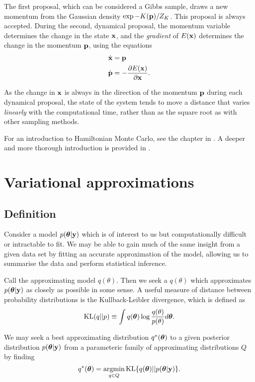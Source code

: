 \documentclass{amsart}[12pt]
\begin{document}
The first proposal, which can be considered a Gibbs sample, draws a new momentum from the Gaussian density
$\exp{-K({\bf p})}/Z_K$. This proposal is always accepted. During the second, dynamical proposal, the momentum
variable determines the change in the state ${\bf x}$, and the \emph{gradient} of $E({\bf x})$ determines the change
in the momentum ${\bf p}$, using the equations
\begin{align*}
	\dot{{\bf x}} & = {\bf p}                                    \\
	\dot{{\bf p}} & = -\frac{\partial E({\bf x})}{\partial {\bf x}}. 
\end{align*}

As the change in ${\bf x}$ is always in the direction of the momentum ${\bf p}$ during each dynamical proposal, the
state of the system tends to move a distance that varies \emph{linearly} with the computational time, rather
than as the square root as with other sampling methods.

For an introduction to Hamiltonian Monte Carlo, see the chapter in \cite{MacKay:2002:ITI:971143}. A deeper
and more thorough introduction is provided in \cite{Betancourt2017}.


\section{Variational approximations}

\subsection{Definition}

Consider a model $p({\boldsymbol \theta}|{\bf y})$ which is of interest to us but computationally difficult or intractable to 
fit. We may be able to gain much of the same insight from a given data set by fitting an accurate approximation 
of the model, allowing us to summarise the data and perform statistical inference.

Call the approximating model $q(\theta)$. Then we seek a $q(\theta)$ which approximates $p({\boldsymbol \theta}|{\bf y})$
as closely as possible in some sense. A useful measure of distance between probability distributions is the
Kullback-Leibler divergence, which is defined as
\[
	\text{KL}(q || p) \equiv \int q({\boldsymbol \theta}) \log{\frac{q(\theta)}{p(\theta)}} d {\boldsymbol \theta}.
\]

We may seek a best approximating distribution $q^*({\boldsymbol \theta})$ to a given posterior distribution
$p({\boldsymbol \theta}|{\bf y})$ from a parameteric family of approximating distributions $Q$ by finding
\[
	q^*(\vtheta) = \argmin_{q \in Q} \KL \{ {q(\vtheta) || p(\vtheta|\vy)} \}.
\]
\end{document}
